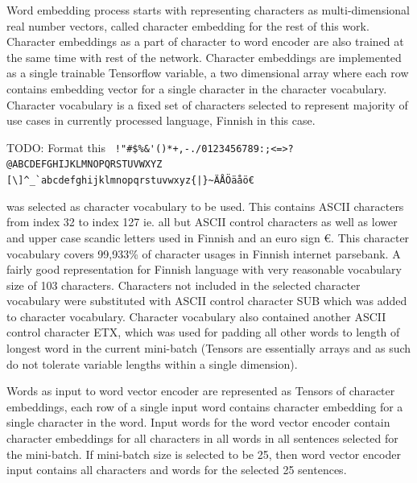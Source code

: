 \documentclass[12pt,a4paper,english
]{tutthesis}
\newcommand\todo[1]{{\color{red}TODO: #1}} %
\begin{document}
Word embedding process starts with representing characters as multi-dimensional real number vectors, called character embedding for the rest of this work. Character embeddings as a part of character to word encoder are also trained at the same time with rest of the network. Character embeddings are implemented as a single trainable Tensorflow variable, a two dimensional array where each row contains embedding vector for a single character in the character vocabulary. Character vocabulary is a fixed set of characters selected to represent majority of use cases in currently processed language, Finnish in this case.

\todo{Format this}
\verb£ !"#$%&'()*+,-./0123456789:;<=>?@ABCDEFGHIJKLMNOPQRSTUVWXYZ£ 
\verb£[\]^_`abcdefghijklmnopqrstuvwxyz{|}~ÄÅÖäåö€£

was selected as character vocabulary to be used. This contains ASCII characters from index 32 to index 127 ie. all but ASCII control characters as well as lower and upper case scandic letters used in Finnish and an euro sign €. This character vocabulary covers 99,933\% of character usages in Finnish internet parsebank. A fairly good representation for Finnish language with very reasonable vocabulary size of 103 characters. Characters not included in the selected character vocabulary were substituted with ASCII control character SUB which was added to character vocabulary. Character vocabulary also contained another ASCII control character ETX, which was used for padding all other words to length of longest word in the current mini-batch (Tensors are essentially arrays and as such do not tolerate variable lengths within a single dimension).

Words as input to word vector encoder are represented as Tensors of character embeddings, each row of a single input word contains character embedding for a single character in the word. Input words for the word vector encoder contain character embeddings for all characters in all words in all sentences selected for the mini-batch. If mini-batch size is selected to be 25, then word vector encoder input contains all characters and words for the selected 25 sentences.
\end{document}
